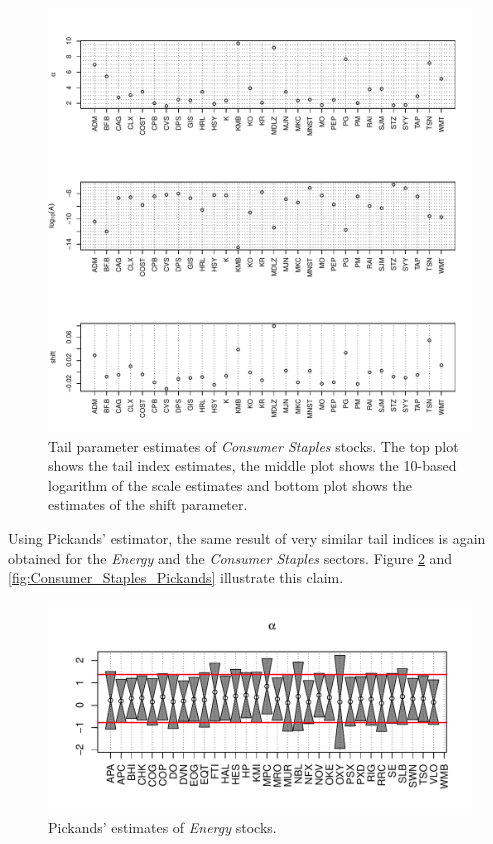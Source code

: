 \documentclass{article}
\begin{document}
\begin{figure}[htb!]
  \includegraphics[width=\textwidth]{Consumer_Staples_OLS_estimates.pdf}
  \caption{Tail parameter estimates of {\it Consumer Staples}
    stocks. The top 
    plot shows the tail index estimates, the middle plot shows the
    10-based logarithm of the scale estimates and bottom plot shows
    the estimates of the shift parameter.
  }
  \label{fig:Consumer_Staples_OLS_estimates}
\end{figure}

Using Pickands' estimator, the same result of very similar tail indices
is again obtained for the {\it Energy} and the {\it Consumer Staples}
sectors. Figure \ref{fig:Energy_Pickands} and
\ref{fig:Consumer_Staples_Pickands} illustrate this claim.
\begin{figure}[htb!]
  \includegraphics[width=\textwidth]{Energy_Pickands.pdf}
  \caption{Pickands' estimates of {\it Energy} stocks.}
  \label{fig:Energy_Pickands}
\end{figure}
\end{document}
